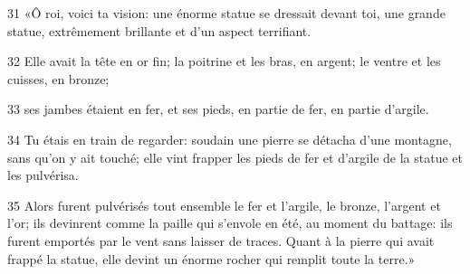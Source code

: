 31 «Ô roi, voici ta vision: une énorme statue se dressait devant toi, une grande statue, extrêmement brillante et d’un aspect terrifiant.

32 Elle avait la tête en or fin; la poitrine et les bras, en argent; le ventre et les cuisses, en bronze;

33 ses jambes étaient en fer, et ses pieds, en partie de fer, en partie d’argile.

34 Tu étais en train de regarder: soudain une pierre se détacha d’une montagne, sans qu’on y ait touché; elle vint frapper les pieds de fer et d’argile de la statue et les pulvérisa.

35 Alors furent pulvérisés tout ensemble le fer et l’argile, le bronze, l’argent et l’or; ils devinrent comme la paille qui s’envole en été, au moment du battage: ils furent emportés par le vent sans laisser de traces. Quant à la pierre qui avait frappé la statue, elle devint un énorme rocher qui remplit toute la terre.»
